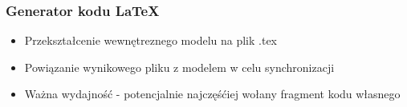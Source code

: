 \documentclass[t]{beamer}
\begin{document}
\begin{frame}[T]
{\begin{columns}[T]
		\begin{column}{.5\textwidth}
			\centering
		\end{column}
		\begin{column}{.5\textwidth}
			\centering
		\end{column}
		\end{columns}
	}
\end{frame}

\begin{frame}
	\frametitle{Generator kodu \LaTeX}
	\begin{itemize}
		\item Przekształcenie wewnętreznego modelu na plik .tex
		\item Powiązanie wynikowego pliku z modelem w celu synchronizacji
		\item Ważna wydajność - potencjalnie najczęśćiej wołany fragment kodu własnego
	\end{itemize}
\end{frame}
\end{document}
